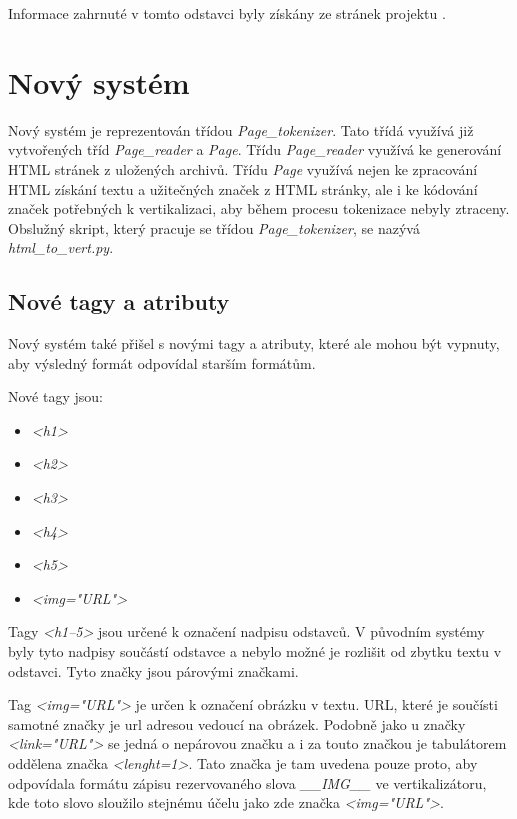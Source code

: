 Informace zahrnuté v tomto odstavci byly získány ze stránek projektu \cite{DEDUPLIKACE}.


\section{Nový systém}
Nový systém je reprezentován třídou \textit{Page\_tokenizer}. Tato třídá využívá již vytvořených tříd
\textit{Page\_reader} a \textit{Page}. Třídu \textit{Page\_reader} využívá ke generování HTML stránek
z uložených archivů. Třídu \textit{Page} využívá nejen ke zpracování HTML získání textu a užitečných značek
z HTML stránky, ale i ke kódování značek potřebných k vertikalizaci, aby během procesu tokenizace nebyly
ztraceny. Obslužný skript, který pracuje se třídou \textit{Page\_tokenizer}, se nazývá \textit{html\_to\_vert.py}.

\subsection{Nové tagy a atributy}
Nový systém také přišel s novými tagy a atributy, které ale mohou být vypnuty, aby výsledný formát odpovídal
starším formátům.

Nové tagy jsou:
\begin{itemize}
    \item \textit{<h1>}
    \item \textit{<h2>}
    \item \textit{<h3>}
    \item \textit{<h4>}
    \item \textit{<h5>}
    \item \textit{<img="URL"\textgreater}
\end{itemize}

Tagy \textit{<h1--5>} jsou určené k označení nadpisu odstavců. V původním systémy byly tyto nadpisy součástí
odstavce a nebylo možné je rozlišit od zbytku textu v odstavci. Tyto značky jsou párovými značkami.

Tag \textit{<img="URL"\textgreater} je určen k označení obrázku v textu. URL, které je součísti samotné značky je url adresou
vedoucí na obrázek. Podobně jako u značky \textit{<link="URL"\textgreater} se jedná o nepárovou značku a i za touto značkou
je tabulátorem oddělena značka \textit{<lenght=1>}. Tato značka je tam uvedena pouze proto, aby odpovídala
formátu zápisu rezervovaného slova \textit{\_\_IMG\_\_} ve vertikalizátoru, kde toto slovo sloužilo stejnému
účelu jako zde značka \textit{<img="URL"\textgreater}.


